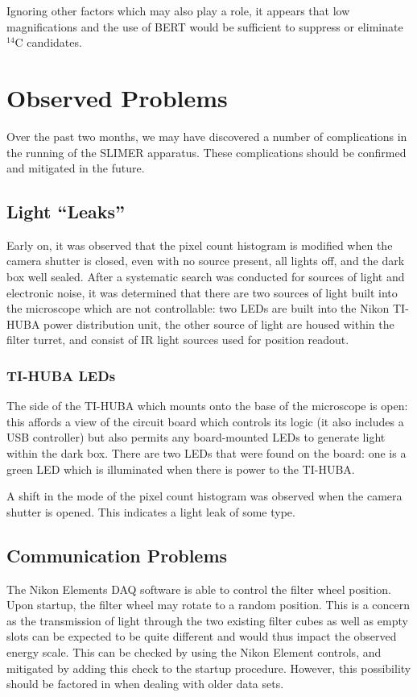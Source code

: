 \documentclass[11pt]{article}
\newcommand{\nuc}[2]{\ensuremath{^{#1}}#2}
\begin{document}
Ignoring other factors which may also play a role, it appears that low magnifications and the use of BERT would be sufficient to suppress or eliminate \nuc{14}{C} candidates.    


      
 
  
\section{Observed Problems}
Over the past two months, we may have discovered a number of complications in the running of the SLIMER apparatus. These complications should be confirmed and mitigated in the future.

\subsection{Light ``Leaks''}
Early on, it was observed that the pixel count histogram is modified when the camera shutter is closed, even with no source present, all lights off, and the dark box well sealed. After a systematic 
search was conducted for sources of light and electronic noise, it was determined that there are two sources of light built into the microscope which are not controllable: two LEDs are built into the Nikon TI-HUBA power distribution unit, the other source of light are housed within the filter turret, and consist of IR light sources used for position readout. 

\subsubsection{TI-HUBA LEDs}
The side of the TI-HUBA which mounts onto the base of the microscope is open: this affords a view of the circuit board which controls its logic (it also includes a USB controller) but also permits any board-mounted LEDs to generate light within the dark box. There are two LEDs that were found on the board: one is a green LED which is illuminated when there is power to the TI-HUBA.  



A shift in the mode of the pixel count histogram was observed when the camera shutter is opened. This indicates a light leak of some type. 

\subsection{Communication Problems}
The Nikon Elements DAQ software is able to control the filter wheel position. Upon startup, the filter wheel may rotate to a random position. This is a concern as the transmission of 
light through the two existing filter cubes as well as empty slots can be expected to be quite different and would thus impact the observed energy scale.
This can be checked by using the Nikon Element controls, and mitigated by adding this check to the startup procedure. However, this possibility should be factored in
when dealing with older data sets. 
\end{document}
